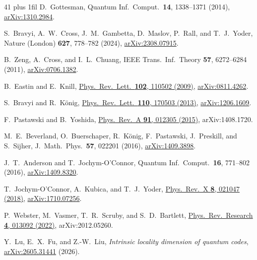 \documentclass[aps,prl,reprint,notitlepage,nofootinbib,nobibnotes]{revtex4-2}
\begin{document}
\begin{thebibliography}{41}
\rightskip=0pt plus 1fil\relax
{}
D.~Gottesman,
Quantum Inf.\ Comput.\ \textbf{14}, 1338--1371 (2014),
\href{https://arxiv.org/abs/1310.2984}{arXiv:1310.2984}.

S.~Bravyi, A.~W.~Cross, J.~M.~Gambetta, D.~Maslov, P.~Rall, and T.~J.~Yoder,
Nature (London) \textbf{627}, 778--782 (2024),
\href{https://arxiv.org/abs/2308.07915}{arXiv:2308.07915}.

B.~Zeng, A.~Cross, and I.~L.~Chuang,
IEEE Trans.\ Inf.\ Theory \textbf{57}, 6272--6284 (2011),
\href{https://arxiv.org/abs/0706.1382}{arXiv:0706.1382}.

B.~Eastin and E.~Knill,
\href{https://link.aps.org/doi/10.1103/PhysRevLett.102.110502}{Phys.\ Rev.\ Lett.\ \textbf{102}, 110502 (2009)},
\href{https://arxiv.org/abs/0811.4262}{arXiv:0811.4262}.

S.~Bravyi and R.~K\"onig,
\href{https://link.aps.org/doi/10.1103/PhysRevLett.110.170503}{Phys.\ Rev.\ Lett.\ \textbf{110}, 170503 (2013)},
\href{https://arxiv.org/abs/1206.1609}{arXiv:1206.1609}.

F.~Pastawski and B.~Yoshida,
\href{https://link.aps.org/doi/10.1103/PhysRevA.91.012305}{Phys.\ Rev.\ A \textbf{91}, 012305 (2015)},
arXiv:1408.1720.

M.~E.~Beverland, O.~Buerschaper, R.~K\"onig, F.~Pastawski, J.~Preskill, and S.~Sijher,
J.\ Math.\ Phys.\ \textbf{57}, 022201 (2016),
\href{https://arxiv.org/abs/1409.3898}{arXiv:1409.3898}.

J.~T.~Anderson and T.~Jochym-O'Connor,
Quantum Inf.\ Comput.\ \textbf{16}, 771--802 (2016),
\href{https://arxiv.org/abs/1409.8320}{arXiv:1409.8320}.

T.~Jochym-O'Connor, A.~Kubica, and T.~J.~Yoder,
\href{https://link.aps.org/doi/10.1103/PhysRevX.8.021047}{Phys.\ Rev.\ X \textbf{8}, 021047 (2018)},
\href{https://arxiv.org/abs/1710.07256}{arXiv:1710.07256}.

P.~Webster, M.~Vasmer, T.~R.~Scruby, and S.~D.~Bartlett,
\href{https://link.aps.org/doi/10.1103/PhysRevResearch.4.013092}{Phys.\ Rev.\ Research \textbf{4}, 013092 (2022)},
arXiv:2012.05260.

Y.~Lu, E.~X.~Fu, and Z.-W.~Liu,
\emph{Intrinsic locality dimension of quantum codes},
\href{https://arxiv.org/abs/2605.31441}{arXiv:2605.31441} (2026).


\end{thebibliography}
\end{document}
